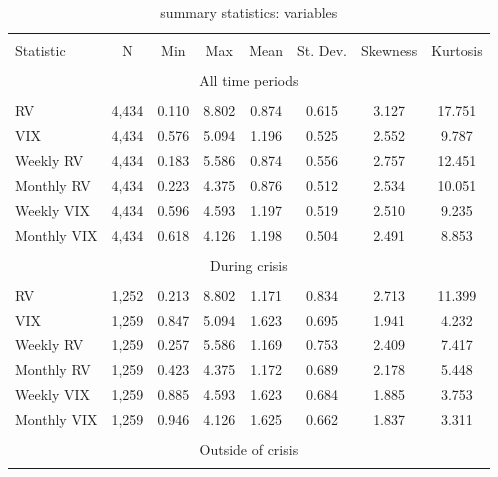 \begin{table}[!htbp] \centering 
  \caption{summary statistics: variables} 
  \label{tab:summary1} 
\begin{tabular}{@{\extracolsep{5pt}}lccccccc} 
\\[-1.8ex]\hline 
\hline \\[-1.8ex] 
Statistic & \multicolumn{1}{c}{N} & \multicolumn{1}{c}{Min} & \multicolumn{1}{c}{Max} & \multicolumn{1}{c}{Mean} & \multicolumn{1}{c}{St. Dev.} & \multicolumn{1}{c}{Skewness} & \multicolumn{1}{c}{Kurtosis} \\
\hline \\[-1.8ex] 
\multicolumn{8}{c}{All time periods} \\
\hline \\[-1.8ex] 
RV & 4,434 & 0.110 & 8.802 & 0.874 & 0.615 & 3.127 & 17.751 \\ 
VIX & 4,434 & 0.576 & 5.094 & 1.196 & 0.525 & 2.552 & 9.787 \\ 
Weekly RV & 4,434 & 0.183 & 5.586 & 0.874 & 0.556 & 2.757 & 12.451 \\ 
Monthly RV & 4,434 & 0.223 & 4.375 & 0.876 & 0.512 & 2.534 & 10.051\\ 
Weekly VIX & 4,434 & 0.596 & 4.593 & 1.197 & 0.519 & 2.510 & 9.235 \\ 
Monthly VIX & 4,434 & 0.618 & 4.126 & 1.198 & 0.504 & 2.491 & 8.853 \\ 
\hline \\[-1.8ex] 
\multicolumn{8}{c}{During crisis} \\
\hline \\[-1.8ex] 
RV & 1,252 & 0.213 & 8.802 & 1.171 & 0.834 & 2.713 & 11.399\\ 
VIX  & 1,259 & 0.847 & 5.094 & 1.623 & 0.695  & 1.941 &  4.232\\ 
Weekly RV & 1,259 & 0.257 & 5.586 & 1.169 & 0.753 & 2.409 & 7.417\\ 
Monthly RV & 1,259 & 0.423 & 4.375 & 1.172 & 0.689 & 2.178 & 5.448\\ 
Weekly VIX & 1,259 & 0.885 & 4.593 & 1.623 & 0.684  &  1.885 & 3.753\\ 
Monthly VIX & 1,259 & 0.946 & 4.126 & 1.625 & 0.662 & 1.837 & 3.311\\ 
\hline \\[-1.8ex] 
\multicolumn{8}{c}{Outside of crisis} \\
\hline \\[-1.8ex] 

\end{tabular}
\end{table}
